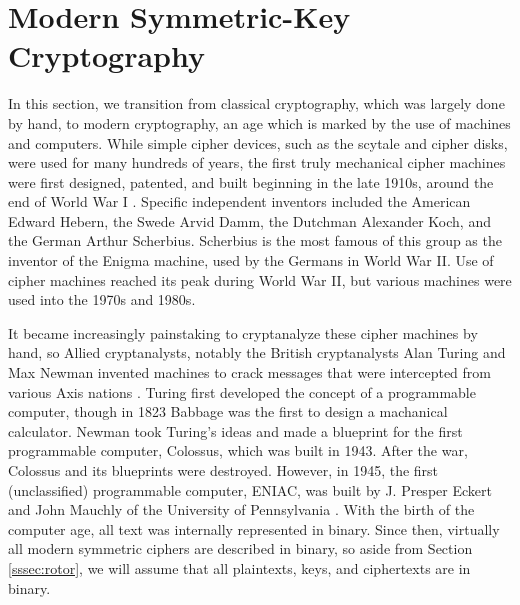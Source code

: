\chapter{Modern Symmetric-Key Cryptography}
\label{ch:symmetric}

In this section, we transition from classical cryptography, which was largely done by hand, to modern cryptography, an age which is marked by the use of machines and computers. While simple cipher devices, such as the scytale  and cipher disks, were used for many hundreds of years, the first truly mechanical cipher machines  were first designed, patented, and built beginning in the late 1910s, around the end of World War I \cite{hac, singh}. Specific independent inventors included the American Edward Hebern,  the Swede Arvid Damm,  the Dutchman Alexander Koch,  and the German Arthur Scherbius.  Scherbius is the most famous of this group as the inventor of the Enigma  machine, used by the Germans in World War II. Use of cipher machines reached its peak during World War II, but various machines were used into the 1970s and 1980s.

It became increasingly painstaking to cryptanalyze these cipher machines by hand, so Allied cryptanalysts, notably the British cryptanalysts Alan Turing  and Max Newman  invented machines to crack messages that were intercepted from various Axis nations \cite{singh}. Turing first developed the concept of a programmable computer, though in 1823 Babbage  was the first to design a machanical calculator. Newman took Turing's ideas and made a blueprint for the first programmable computer, Colossus,  which was built in 1943. After the war, Colossus and its blueprints were destroyed. However, in 1945, the first (unclassified) programmable computer, ENIAC, was built by J. Presper Eckert and John Mauchly of the University of Pennsylvania \cite {singh}. With the birth of the computer age, all text was internally represented in binary. Since then, virtually all modern symmetric ciphers are described in binary, so aside from Section \ref{sssec:rotor}, we will assume that all plaintexts, keys, and ciphertexts are in binary.

